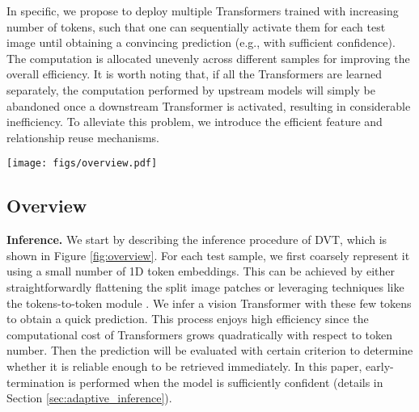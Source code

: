 \documentclass{article}
\begin{document}
In specific, we propose to deploy multiple Transformers trained with increasing number of tokens, such that one can sequentially activate them for each test image until obtaining a convincing prediction (e.g., with sufficient confidence). The computation is allocated unevenly across different samples for improving the overall efficiency. It is worth noting that, if all the Transformers are learned separately, the computation performed by upstream models will simply be abandoned once a downstream Transformer is activated, resulting in considerable inefficiency. To alleviate this problem, we introduce the efficient feature and relationship reuse mechanisms.






\begin{figure*}[t]
\begin{center}
    \centerline{\texttt{[image: figs/overview.pdf]}}
\caption{
        An overview of \emph{Dynamic Vision Transformers} (DVT). Under the objective of configuring proper token numbers conditioned on the inputs, we cascade multiple Transformers with increasing number of tokens. At test time, they are sequentially activated until a convincing prediction (e.g. sufficiently confident) has been obtained or the final model has been inferred. The feature and relationship reuse mechanisms allow reusing computation across different Transformers. 
    }
    \label{fig:overview}
    \end{center}
    \vspace{-2.5ex}
\end{figure*}

\vspace{-1ex}
\subsection{Overview}
\vspace{-1ex}
\textbf{Inference.}
We start by describing the inference procedure of DVT, which is shown in Figure \ref{fig:overview}. For each test sample, we first coarsely represent it using a small number of 1D token embeddings. This can be achieved by either straightforwardly flattening the split image patches \cite{dosovitskiy2021an, han2021transformer} or leveraging techniques like the tokens-to-token module \cite{yuan2021tokens}. We infer a vision Transformer with these few tokens to obtain a quick prediction. This process enjoys high efficiency since the computational cost of Transformers grows quadratically with respect to token number. Then the prediction will be evaluated with certain criterion to determine whether it is reliable enough to be retrieved immediately. In this paper, early-termination is performed when the model is sufficiently confident (details in Section \ref{sec:adaptive_inference}).
\end{document}

